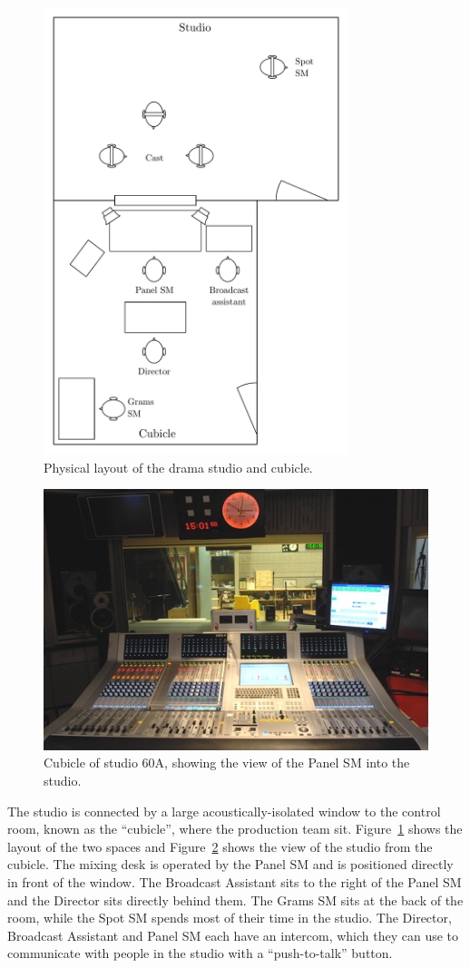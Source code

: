\begin{figure}[p]
  \centering
  \includegraphics[width=3.5in]{figs/drama-layout.pdf}
  \caption{Physical layout of the drama studio and cubicle.}
  \label{fig:drama-layout}
\end{figure}

\begin{figure}[p]
  \centering
  \includegraphics[width=.7\columnwidth]{figs/60a.jpg}
  \caption{Cubicle of studio 60A, showing the view of the Panel SM into the studio.}
  \label{fig:drama-studio}
\end{figure}

The studio is connected by a large acoustically-isolated window to the control room, known as the ``cubicle'', where
the production team sit.  Figure~\ref{fig:drama-layout} shows the layout of the two spaces and
Figure~\ref{fig:drama-studio} shows the view of the studio from the cubicle.  The mixing desk is operated by the Panel
SM and is positioned directly in front of the window.  The Broadcast Assistant sits to the right of the Panel SM and
the Director sits directly behind them. The Grams SM sits at the back of the room, while the Spot SM spends most of
their time in the studio.  The Director, Broadcast Assistant and Panel SM each have an intercom, which they can use to
communicate with people in the studio with a ``push-to-talk'' button.

